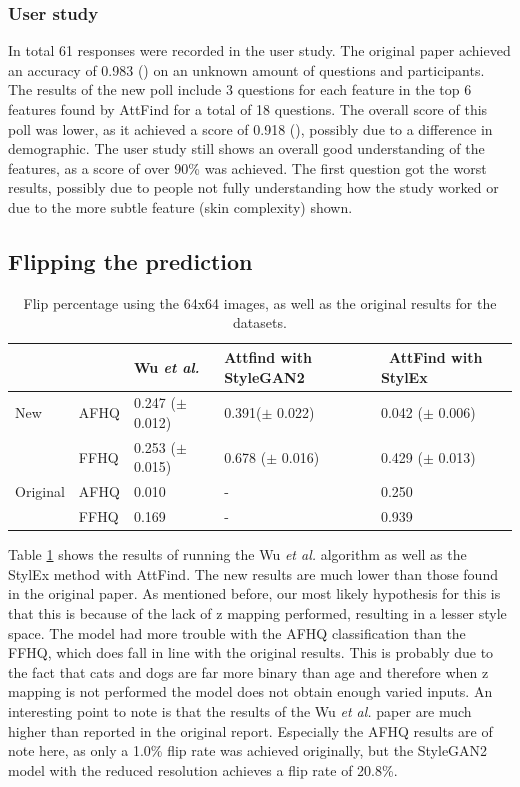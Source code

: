 \subsubsection{User study}
In total 61 responses were recorded in the user study. The original paper achieved an accuracy of 0.983 () on an unknown amount of questions and participants. The results of the new poll include 3 questions for each feature in the top 6 features found by AttFind for a total of 18 questions. The overall score of this poll was lower, as it achieved a score of 0.918 (), possibly due to a difference in demographic. The user study still shows an overall good understanding of the features, as a score of over 90\% was achieved. The first question got the worst results, possibly due to people not fully understanding how the study worked or due to the more subtle feature (skin complexity) shown.

\subsection{Flipping the prediction}
\begin{table}[H]
\centering
\begin{tabular}{|ll|lll|}
\hline
         &      & Wu \textit{et al.}         & Attfind with StyleGAN2 & ~AttFind with StylEx  \\
\hline
New     & AFHQ & 0.247 ($\pm$ 0.012) & 0.391($\pm$  0.022)      & 0.042 ($\pm$ 0.006)            \\
         & FFHQ & 0.253 ($\pm$  0.015) & 0.678 ($\pm$  0.016)      & 0.429 ($\pm$  0.013)     \\
\hline
Original & AFHQ & 0.010             & -                  & 0.250                 \\
         & FFHQ & 0.169~ ~          & -                  & 0.939                 \\
\hline
\end{tabular}
\caption{Flip percentage using the 64x64 images, as well as the original results for the datasets.}
\label{tab:res}
\end{table}
\label{sec:claim3}


Table \ref{tab:res} shows the results of running the Wu \textit{et al.} algorithm as well as the StylEx method with AttFind. The new results are much lower than those found in the original paper. As mentioned before, our most likely hypothesis for this is that this is because of the lack of z mapping performed, resulting in a lesser style space. The model had more trouble with the AFHQ classification than the FFHQ, which does fall in line with the original results. This is probably due to the fact that cats and dogs are far more binary than age and therefore when z mapping is not performed the model does not obtain enough varied inputs. An interesting point to note is that the results of the Wu \textit{et al.} paper are much higher than reported in the original report. Especially the AFHQ results are of note here, as only a 1.0\% flip rate was achieved originally, but the StyleGAN2 model with the reduced resolution achieves a flip rate of 20.8\%.

